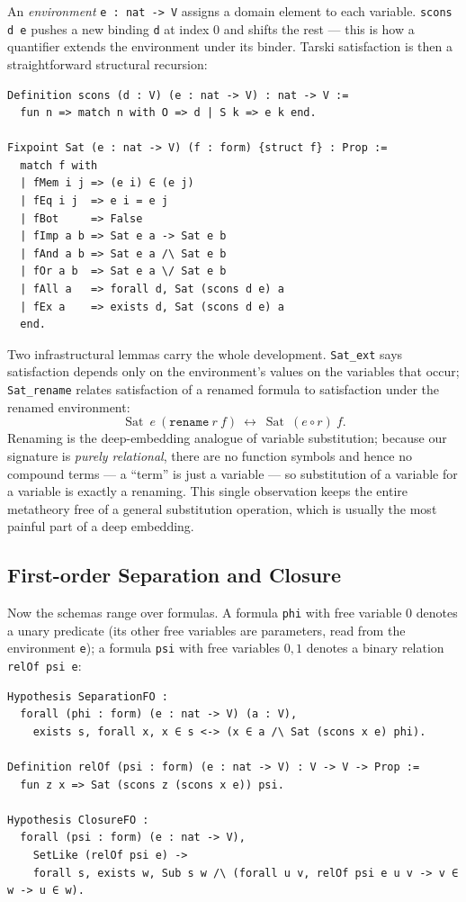 \documentclass[11pt]{article}
\theoremstyle{plain}
\theoremstyle{definition}
\DeclareMathOperator{\Sat}{Sat}
\newcommand{\cq}[1]{\lstinline[basicstyle=\ttfamily]|#1|}
\begin{document}
An \emph{environment} \cq{e : nat -> V} assigns a domain element to each variable.
\cq{scons d e} pushes a new binding \cq{d} at index $0$ and shifts the rest ---
this is how a quantifier extends the environment under its binder. Tarski
satisfaction is then a straightforward structural recursion:

\begin{lstlisting}
Definition scons (d : V) (e : nat -> V) : nat -> V :=
  fun n => match n with O => d | S k => e k end.

Fixpoint Sat (e : nat -> V) (f : form) {struct f} : Prop :=
  match f with
  | fMem i j => (e i) ∈ (e j)
  | fEq i j  => e i = e j
  | fBot     => False
  | fImp a b => Sat e a -> Sat e b
  | fAnd a b => Sat e a /\ Sat e b
  | fOr a b  => Sat e a \/ Sat e b
  | fAll a   => forall d, Sat (scons d e) a
  | fEx a    => exists d, Sat (scons d e) a
  end.
\end{lstlisting}

Two infrastructural lemmas carry the whole development. \cq{Sat_ext} says
satisfaction depends only on the environment's values on the variables that occur;
\cq{Sat_rename} relates satisfaction of a renamed formula to satisfaction under the
renamed environment:
\[
  \Sat\ e\ (\mathtt{rename}\ r\ f)\ \leftrightarrow\ \Sat\ (e\circ r)\ f.
\]
Renaming is the deep-embedding analogue of variable substitution; because our
signature is \emph{purely relational}, there are no function symbols and hence no
compound terms --- a ``term'' is just a variable --- so substitution of a variable
for a variable is exactly a renaming. This single observation keeps the entire
metatheory free of a general substitution operation, which is usually the most
painful part of a deep embedding.

\subsection{First-order Separation and Closure}

Now the schemas range over formulas. A formula \cq{phi} with free variable $0$
denotes a unary predicate (its other free variables are parameters, read from the
environment \cq{e}); a formula \cq{psi} with free variables $0,1$ denotes a binary
relation \cq{relOf psi e}:

\begin{lstlisting}
Hypothesis SeparationFO :
  forall (phi : form) (e : nat -> V) (a : V),
    exists s, forall x, x ∈ s <-> (x ∈ a /\ Sat (scons x e) phi).

Definition relOf (psi : form) (e : nat -> V) : V -> V -> Prop :=
  fun z x => Sat (scons z (scons x e)) psi.

Hypothesis ClosureFO :
  forall (psi : form) (e : nat -> V),
    SetLike (relOf psi e) ->
    forall s, exists w, Sub s w /\ (forall u v, relOf psi e u v -> v ∈ w -> u ∈ w).
\end{lstlisting}
\end{document}
